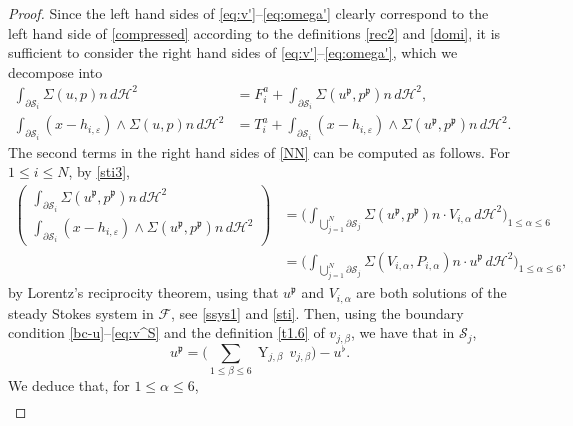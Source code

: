 \documentclass[11pt]{article}
\let\oldbigcup\bigcup
\let\eps\varepsilon
\DeclareMathOperator{\Y}{Y}
\theoremstyle{definition}
\theoremstyle{remark}
\begin{document}
\begin{proof}
Since the left hand sides of \eqref{eq:v'}--\eqref{eq:omega'} clearly correspond to
the left hand side of \eqref{compressed} according to the definitions \eqref{rec2} and \eqref{domi}, it is sufficient to
consider the right hand sides of \eqref{eq:v'}--\eqref{eq:omega'}, which we decompose into
\begin{subequations}
\label{NN}
\begin{align}
\int_{\partial \mathcal S_i } \Sigma(u,p) n \, d\mathcal{H}^2
&= F_i^a +\int_{\partial \mathcal S_i } \Sigma (u^\mathfrak{p}, p^\mathfrak{p}) n \, d\mathcal{H}^2, \\
\int_{\partial \mathcal S_i} (x - h_{i,\eps}) \wedge \Sigma(u,p) n \, d\mathcal{H}^2
&= T_i^a +
\int_{\partial \mathcal S_i} (x - h_{i,\eps}) \wedge \Sigma (u^\mathfrak{p}, p^\mathfrak{p}) n \, d\mathcal{H}^2.
\end{align}
\end{subequations}
The second terms in the right hand sides of \eqref{NN} can be computed as follows.
For $1 \leq i \leq N$, by \eqref{sti3},
\begin{align*}
\begin{pmatrix}
\int_{\partial \mathcal S_i } \Sigma(u^\mathfrak{p}, p^\mathfrak{p}) n \, d\mathcal{H}^2 \\
\int_{\partial \mathcal S_i} (x - h_{i,\eps}) \wedge \Sigma(u^\mathfrak{p}, p^\mathfrak{p}) n \, d\mathcal{H}^2
\end{pmatrix}
&=
\biggl(
\int_{\oldbigcup_{j=1}^N \partial \mathcal S_j }
\Sigma(u^\mathfrak{p}, p^\mathfrak{p}) n \cdot V_{i,\alpha} \, d\mathcal{H}^2
\biggr)_{1 \leq \alpha \leq 6}
\\ &=
\biggl(
\int_{\oldbigcup_{j=1}^N \partial \mathcal S_j } \Sigma(V_{i,\alpha}, P_{i,\alpha}) n \cdot u^\mathfrak{p} \, d\mathcal{H}^2
\biggr)_{1 \leq \alpha \leq 6},
\end{align*}
by Lorentz's reciprocity theorem, using that $u^\mathfrak{p}$ and $V_{i,\alpha}$ are both solutions of the steady Stokes system in $ \mathcal F$, see \eqref{ssys1} and \eqref{sti}.
Then, using the boundary condition \eqref{bc-u}--\eqref{eq:v^S} and the definition \eqref{t1.6} of $v_{j,\beta}$, we have that in $ \mathcal{S}_j$,
\begin{equation} \label{rec1}
u^\mathfrak{p} = \biggl(\sum_{1\leq \beta \leq 6} \Y_{j,\beta }\, v_{j,\beta}\biggr) - u^\flat.
\end{equation}
We deduce that, for $1 \leq \alpha \leq 6$,
\begin{multline*}

\end{multline*}
\end{proof}
\end{document}
